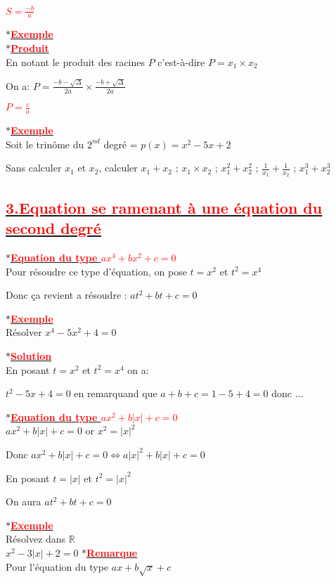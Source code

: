 \documentclass[12pt]{article}
\begin{document}
	\textbf{\textcolor{red}{$S=\frac{-b}{a}$}}
	
$\ast$\underline{\textbf{\textcolor{red}{Exemple}}}\\
$\ast$\underline{\textbf{\textcolor{red}{Produit}}}\\
En notant le produit des racines $P$ c'est-à-dire $P=x_{1}\times x_{2}$

On a: $P=\frac{-b-\sqrt{\Delta}}{2a}\times \frac{-b+\sqrt{\Delta}}{2a}$

	\textbf{\textcolor{red}{$P=\frac{c}{a}$}}
	
$\ast$\underline{\textbf{\textcolor{red}{Exemple}}}\\
Soit le trinôme du $2^{nd}$ degré = $p(x)=x^{2}-5x+2$

Sans calculer $x_{1}$ et $x_{2}$, calculer $x_{1}+x_{2}$ ; $x_{1}\times x_{2}$ ; 
$x_{1}^{2}+x_{2}^{2}$ ; $\frac{1}{x_{1}}+\frac{1}{x_{2}}$ ; $x_{1}^{3}+x_{2}^{3}$
\subsection*{\underline{\textbf{\textcolor{red}{3.Equation se ramenant à une équation du second degré}}}}
$\ast$\underline{\textbf{\textcolor{red}{Equation du type $ax^{4}+bx^{2}+c=0$}}}\\
Pour résoudre ce type d'équation, on pose $t=x^{2}$ et $t^{2}=x^{4}$

Donc ça revient a résoudre : $at^{2}+bt+c=0$

$\ast$\underline{\textbf{\textcolor{red}{Exemple}}}\\
Résolver $x^{4}-5x^{2}+4=0$

$\ast$\underline{\textbf{\textcolor{red}{Solution}}}\\
En posant $t=x^{2}$ et $t^{2}=x^{4}$ on a:

$t^{2}-5x+4=0$ en remarquand que $a+b+c=1-5+4=0$ donc ...

$\ast$\underline{\textbf{\textcolor{red}{Equation du type $ax^{2}+b|x|+c=0$}}}\\
$ax^{2}+b|x|+c=0$ or $x^{2}=|x|^{2}$

Donc $ax^{2}+b|x|+c=0 \Leftrightarrow a|x|^{2}+b|x|+c=0$

En posant $t=|x|$ et $t^{2}=|x|^{2}$

On aura $at^{2}+bt+c=0$

$\ast$\underline{\textbf{\textcolor{red}{Exemple}}}\\
Résolvez dans $\mathbb{R}$\\
$x^{2}-3|x|+2=0$
$\ast$\underline{\textbf{\textcolor{red}{Remarque}}}\\
Pour l'équation du type $ax+b\sqrt{x}+c$
\end{document}
